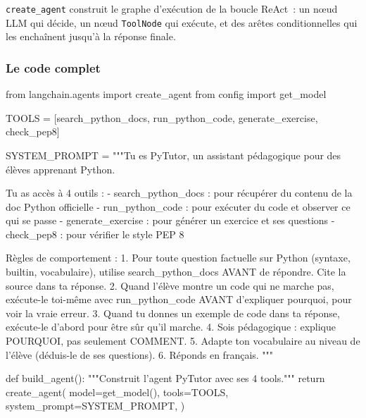 \documentclass[11pt,a4paper]{article}
\begin{document}
\begin{center}
\end{center}

\texttt{create\_agent} construit le graphe d'exécution de la boucle
ReAct~: un nœud LLM qui décide, un nœud \texttt{ToolNode} qui exécute,
et des arêtes conditionnelles qui les enchaînent jusqu'à la réponse
finale.

\subsubsection{Le code complet}

\begin{pythoncode}
from langchain.agents import create_agent
from config import get_model


TOOLS = [search_python_docs, run_python_code, generate_exercise, check_pep8]

SYSTEM_PROMPT = """Tu es PyTutor, un assistant pédagogique pour des élèves apprenant Python.

Tu as accès à 4 outils :
  - search_python_docs : pour récupérer du contenu de la doc Python officielle
  - run_python_code    : pour exécuter du code et observer ce qui se passe
  - generate_exercise  : pour générer un exercice et ses questions
  - check_pep8         : pour vérifier le style PEP 8

Règles de comportement :
1. Pour toute question factuelle sur Python (syntaxe, builtin, vocabulaire),
   utilise search_python_docs AVANT de répondre. Cite la source dans ta réponse.
2. Quand l'élève montre un code qui ne marche pas, exécute-le toi-même avec
   run_python_code AVANT d'expliquer pourquoi, pour voir la vraie erreur.
3. Quand tu donnes un exemple de code dans ta réponse, exécute-le d'abord pour
   être sûr qu'il marche.
4. Sois pédagogique : explique POURQUOI, pas seulement COMMENT.
5. Adapte ton vocabulaire au niveau de l'élève (déduis-le de ses questions).
6. Réponds en français.
"""


def build_agent():
    """Construit l'agent PyTutor avec ses 4 tools."""
    return create_agent(
        model=get_model(),
        tools=TOOLS,
        system_prompt=SYSTEM_PROMPT,
    )
\end{pythoncode}
\end{document}

